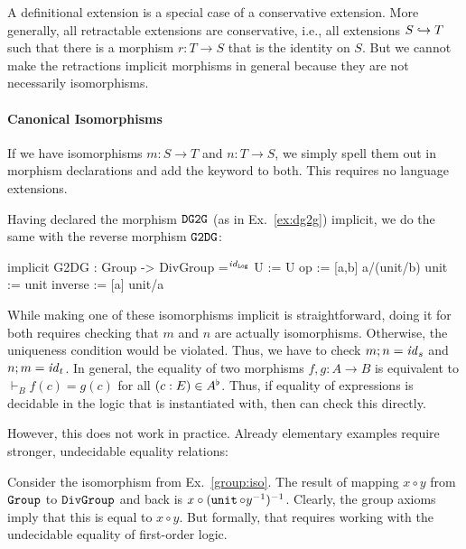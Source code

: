 \begin{remark}
A definitional extension is a special case of a conservative extension.
More generally, all retractable extensions are conservative, i.e., all extensions $S\hookrightarrow T$ such that there is a morphism $r:T\to S$ that is the identity on $S$.
But we cannot make the retractions implicit morphisms in general because they are not necessarily isomorphisms.
\end{remark}

\paragraph{Canonical Isomorphisms}
If we have isomorphisms $m:S\to T$ and $n:T\to S$, we simply spell them out in morphism declarations and add the keyword  to both.
This requires no language extensions.

\begin{example}\label{group:iso}
Having declared the morphism $\operatorname{\mathtt{DG2G}}$ (as in Ex.~\ref{ex:dg2g}) implicit, we do the same with the reverse morphism  $\operatorname{\mathtt{G2DG}}$:
\begin{mmtcode}
implicit G2DG : Group -> DivGroup =$^{\mathit{id}_{\operatorname{\mathtt{Log}}}}$
  U       := U
  op      := [a,b] a/(unit/b) 
  unit    := unit
  inverse := [a] unit/a
\end{mmtcode}
\end{example}

While making one of these isomorphisms implicit is straightforward, doing it for both requires checking that $m$ and $n$ are actually isomorphisms.
Otherwise, the uniqueness condition would be violated.
Thus, we have to check $m;n=\mathit{id}_{s}$ and $n;m=\mathit{id}_{t}$.
In general, the equality of two morphisms $f,g:A\to B$ is equivalent to $\vdash_B f(c)=g(c)$ for all $(c:E)\in A^\flat$.
Thus, if equality of expressions is decidable in the logic that \mmt is instantiated with, then \mmt can check this directly.

However, this does not work in practice.
Already elementary examples require stronger, undecidable equality relations:

\begin{example}
Consider the isomorphism from Ex.~\ref{group:iso}.
The result of mapping $x\circ y$ from $\operatorname{\mathtt{Group}}$ to $\operatorname{\mathtt{DivGroup}}$ and back is $x\circ(\operatorname{\mathtt{unit}}\circ y^{-1})^{-1}$.
Clearly, the group axioms imply that this is equal to $x\circ y$.
But formally, that requires working with the undecidable equality of first-order logic.
\end{example}

